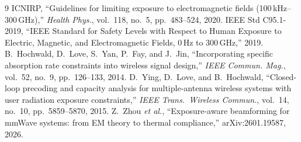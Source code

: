 \documentclass[journal]{IEEEtran}
\begin{document}

\begin{thebibliography}{9}
 ICNIRP, ``Guidelines for limiting exposure to
  electromagnetic fields (100\,kHz--300\,GHz),'' \emph{Health Phys.},
  vol.~118, no.~5, pp.~483--524, 2020.
 IEEE Std C95.1-2019, ``IEEE Standard for Safety
  Levels with Respect to Human Exposure to Electric, Magnetic, and
  Electromagnetic Fields, 0\,Hz to 300\,GHz,'' 2019.
 B.~Hochwald, D.~Love, S.~Yan, P.~Fay, and
  J.~Jin, ``Incorporating specific absorption rate constraints into
  wireless signal design,'' \emph{IEEE Commun. Mag.}, vol.~52, no.~9,
  pp.~126--133, 2014.
 D.~Ying, D.~Love, and B.~Hochwald, ``Closed-loop
  precoding and capacity analysis for multiple-antenna wireless
  systems with user radiation exposure constraints,'' \emph{IEEE
  Trans.\ Wireless Commun.}, vol.~14, no.~10, pp.~5859--5870, 2015.
 Z.~Zhou \emph{et al.}, ``Exposure-aware beamforming
  for mmWave systems: from EM theory to thermal compliance,''
  arXiv:2601.19587, 2026.
\end{thebibliography}
\end{document}
